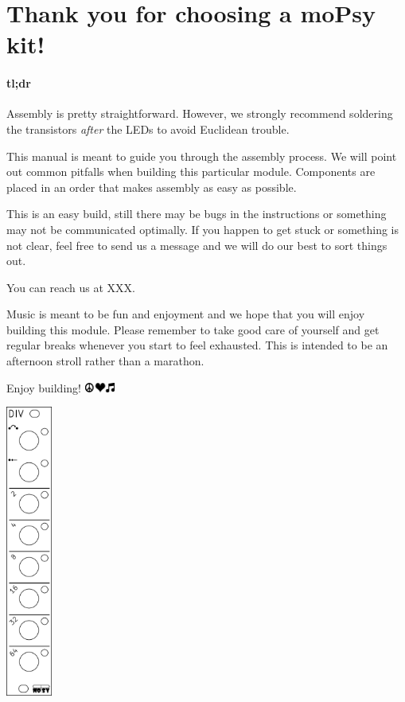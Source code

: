 \documentclass[a4paper,
               11pt,
               parskip=half,
               headinclude,
               titlepage=false]{scrartcl}
\begin{document}
\begin{minipage}{12.5cm}
\setlength{\parskip}{\medskipamount}
\section*{Thank you for choosing a moPsy kit!}

\paragraph{tl;dr} Assembly is pretty straightforward. However, we strongly recommend soldering the transistors \emph{after} the LEDs to avoid Euclidean trouble.

This manual is meant to guide you through the assembly process.
We will point out common pitfalls when building this particular module.
Components are placed in an order that makes assembly as easy as possible.

This is an {\color{level_easy}easy} build, still there may be bugs in the instructions or something may not be communicated optimally.
If you happen to get stuck or something is not clear, feel free to send us a message and we will do our best to sort things out.

You can reach us at XXX.

Music is meant to be fun and enjoyment and we hope that you will enjoy building this module.
Please remember to take good care of yourself and get regular breaks whenever you start to feel exhausted. This is intended to be an afternoon stroll rather than a marathon.

\vspace{1em}
Enjoy building! \quad \includegraphics[height=0.8em]{peace_love_music}

\end{minipage}
\hspace{0.5cm}
\begin{minipage}{1.5cm}
\includegraphics[width=1.5cm]{div-frontpanel}
\end{minipage}
\end{document}
